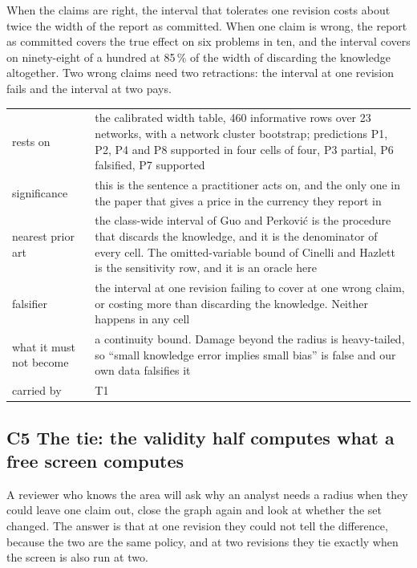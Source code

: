When the claims are right, the interval that tolerates one revision costs about twice the width of
the report as committed. When one claim is wrong, the report as committed covers the true effect on
six problems in ten, and the interval covers on ninety-eight of a hundred at 85\,\% of the width of
discarding the knowledge altogether. Two wrong claims need two retractions: the interval at one
revision fails and the interval at two pays.

\begin{center}\footnotesize
\begin{tabular}{@{}p{2.6cm}p{13.75cm}@{}}
\toprule
rests on & the calibrated width table, 460 informative rows over 23 networks, with a network
cluster bootstrap; predictions P1, P2, P4 and P8 supported in four cells of four, P3 partial, P6
falsified, P7 supported \\
significance & this is the sentence a practitioner acts on, and the only one in the paper that
gives a price in the currency they report in \\
nearest prior art & the class-wide interval of Guo and Perkovi\'c is the procedure that discards
the knowledge, and it is the denominator of every cell. The omitted-variable bound of Cinelli and
Hazlett is the sensitivity row, and it is an oracle here \\
falsifier & the interval at one revision failing to cover at one wrong claim, or costing more than
discarding the knowledge. Neither happens in any cell \\
what it must not become & a continuity bound. Damage beyond the radius is heavy-tailed, so
``small knowledge error implies small bias'' is false and our own data falsifies it \\
carried by & T1 \\
\bottomrule
\end{tabular}
\end{center}

\subsection*{C5 \quad The tie: the validity half computes what a free screen computes}

A reviewer who knows the area will ask why an analyst needs a radius when they could leave one
claim out, close the graph again and look at whether the set changed. The answer is that at one
revision they could not tell the difference, because the two are the same policy, and at two
revisions they tie exactly when the screen is also run at two.

